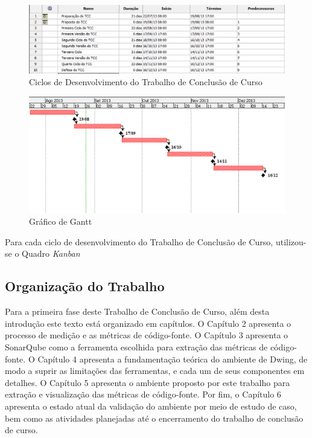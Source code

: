 \begin{figure}[h]
\centering
	\includegraphics[keepaspectratio=true,scale=0.7]{figuras/marcos.eps}
	\caption{Ciclos de Desenvolvimento do Trabalho de Conclusão de Curso}
	\label{cronograma}
\end{figure}

\begin{figure}[h]
\centering
	\includegraphics[keepaspectratio=true,scale=0.7]{figuras/gantt_chart.eps}
	\caption{Gráfico de Gantt}
	\label{gantt}
\end{figure}

Para cada ciclo de desenvolvimento do Trabalho de Conclusão de Curso,  
utilizou-se o Quadro \textit{Kanban}  



\subsection{Organização do Trabalho}
Para a primeira fase deste Trabalho de Conclusão de Curso, além desta introdução 
este texto está organizado em capítulos. O Capítulo 2 apresenta  o processo de 
medição e as métricas de código-fonte.
O Capítulo 3 apresenta o SonarQube como a ferramenta escolhida para extração das 
métricas de código-fonte.
O Capítulo 4 apresenta a fundamentação teórica do ambiente de Dwing, de modo a 
suprir as limitações das ferramentas, e cada um de seus componentes em detalhes. 
O Capítulo 5 apresenta o ambiente proposto por este trabalho para extração e 
visualização das métricas de código-fonte. Por fim, o Capítulo 6 apresenta o 
estado atual da validação 
do ambiente por meio de estudo de caso, bem como as atividades planejadas até o 
encerramento do trabalho de conclusão de curso.

